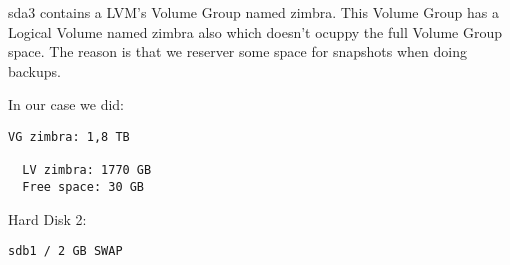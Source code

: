 sda3 contains a LVM's Volume Group named zimbra.
This Volume Group has a Logical Volume named zimbra also which doesn't ocuppy the full Volume Group space. The reason is that we reserver some space for snapshots when doing backups.

In our case we did:
\begin{verbatim}
VG zimbra: 1,8 TB

  LV zimbra: 1770 GB
  Free space: 30 GB
\end{verbatim}


Hard Disk 2:
\begin{verbatim}
sdb1 / 2 GB SWAP
\end{verbatim}
